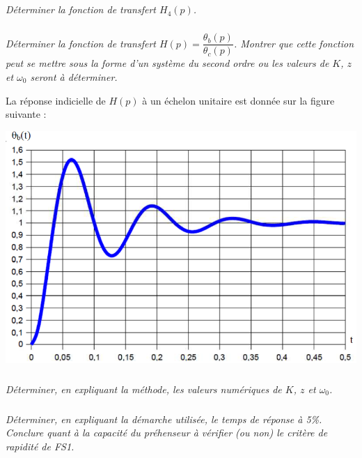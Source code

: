 \documentclass[11pt,oneside]{article}
\begin{document}
\subparagraph{}
\textit{Déterminer la fonction de transfert $H_4(p)$. }

\subparagraph{}
\textit{Déterminer la fonction de transfert $H(p)=\dfrac{\theta_b(p)}{\theta_c(p)}$. Montrer que cette fonction peut se mettre sous la forme d'un système du second ordre ou les valeurs de $K$, $z$ et $\omega_0$ seront à déterminer.}

La réponse indicielle de $H(p)$ à un échelon unitaire est donnée sur la figure suivante :

\begin{center}
\includegraphics[width=.9\textwidth]{png/fig_4}
\end{center}

\subparagraph{}
\textit{Déterminer, en expliquant la méthode, les valeurs numériques de $K$, $z$ et $\omega_0$.}

\subparagraph{}
\textit{Déterminer, en expliquant la démarche utilisée, le temps de réponse à 5\%. Conclure quant à la capacité du préhenseur à vérifier (ou non) le critère de rapidité de FS1.}
\end{document}
